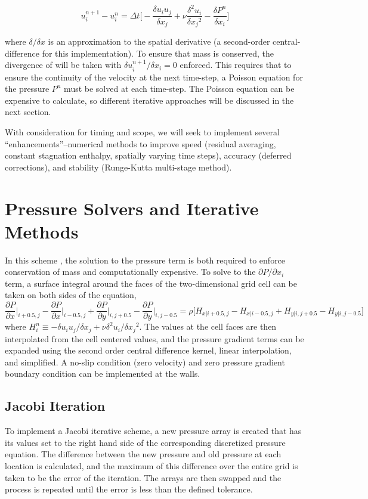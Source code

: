 \documentclass{homework}
\begin{document}
\[ u^{n+1}_i - u^n_i = \Delta t \Big[ -\frac{\delta u_i u_j}{\delta x_j} + \nu \frac{\delta^2 u_i}{\delta {x_j}^2} -\frac{\delta P^n}{\delta x_i} \Big]\]

\noindent
where $\delta / \delta x$ is an approximation to the spatial derivative (a second-order central-difference for this implementation). To ensure that mass is conserved, the divergence of will be taken with $\delta u^{n+1}_i / \delta x_i = 0$ enforced. This requires that to ensure the continuity of the velocity at the next time-step, a Poisson equation for the pressure $P^n$ must be solved at each time-step. The Poisson equation can be expensive to calculate, so different iterative approaches will be discussed in the next section.

With consideration for timing and scope, we will seek to implement several 
``enhancements''--numerical methods to improve speed (residual averaging, constant stagnation enthalpy, spatially varying time steps), accuracy (deferred corrections), and stability (Runge-Kutta multi-stage method).

\section{\textbf{Pressure Solvers and Iterative Methods}}
\noindent In this scheme \cite{Fush2023, Hirsch2007, Hynes2018}, the solution to the pressure term is both required to enforce conservation of mass and computationally expensive. To solve to the $\partial P / \partial x_i$ term, a surface integral around the faces of the two-dimensional grid cell can be taken on both sides of the equation,
\[ \frac{\partial P}{\partial x} \big \rvert_{i+0.5,j} - \frac{\partial P}{\partial x} \big \rvert_{i-0.5,j} + \frac{\partial P}{\partial y} \big \rvert_{i,j+0.5} - \frac{\partial P}{\partial y} \big \rvert_{i,j-0.5} = \rho \big[ H_{x|i+0.5,j} - H_{x|i-0.5,j} + H_{y|i,j+0.5} - H_{y|i,j-0.5}\big]\]
\noindent
where $H^n_i \equiv -\delta u_i u_j / \delta x_j + \nu \delta^2 u_i / \delta {x_j}^2$. The values at the cell faces are then interpolated from the cell centered values, and the pressure gradient terms can be expanded using the second order central difference kernel, linear interpolation, and simplified. A no-slip condition (zero velocity) and zero pressure gradient boundary condition can be implemented at the walls.

\subsection{Jacobi Iteration}
To implement a Jacobi iterative scheme, a new pressure array is created that has its values set to the right hand side of the corresponding discretized pressure equation. The difference between the new pressure and old pressure at each location is calculated, and the maximum of this difference over the entire grid is taken to be the error of the iteration. The arrays are then swapped and the process is repeated until the error
is less than the defined tolerance.
\end{document}
